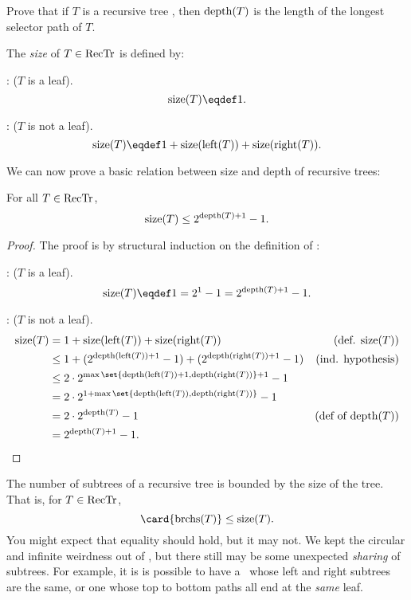 \begin{problem}
Prove that if $T$ is a recursive tree \rectr, then $\text{depth}(T)$ is the
length of the longest selector path of $T$.
\begin{solution}
\end{solution}
\end{problem}

\begin{definition}
The \emph{size} of $T \in \text{RecTr}$ is defined by:

: ($T$ is a leaf).
\[
\sizetr{T} \eqdef 1.
\]

: ($T$ is not a leaf).
\[
\sizetr{T} \eqdef 1 + \sizetr{\leftsub{T}} + \sizetr{\rightsub{T}}.
\]
\end{definition}

We can now prove a basic relation between size and depth of recursive
trees:
\begin{theorem}
For all $T \in \text{RecTr}$,
\[
\text{size}(T) \leq 2^{\text{depth}(T)+1} - 1.
\]
\end{theorem}

\begin{proof}
The proof is by structural induction on the definition of \rectr:

: ($T$ is a leaf).
\[
\sizetr{T} \eqdef 1 = 2^1 - 1 = 2^{\trdpth{T}+1} - 1.
\]

: ($T$ is not a leaf).
\begin{align*}
\sizetr{T}
& = 1 + \sizetr{\leftsub{T}} + \sizetr{\rightsub{T}}
              & \text{(def. $\sizetr{T}$)}\\
& \leq 1 + (2^{\trdpth{\leftsub{T}}+1} -1)  + (2^{\trdpth{\rightsub{T}}+1} -1)
              & \text{(ind. hypothesis)}\\
& \leq  2\cdot 2^{\max\set{\trdpth{\leftsub{T}}+1,\trdpth{\rightsub{T}}}+1} - 1\\
& = 2\cdot 2^{1+\max\set{\trdpth{\leftsub{T}},\trdpth{\rightsub{T}}}} - 1\\
& = 2\cdot 2^{\trdpth{T}} - 1
              & \text{(def of $\trdpth{T}$)}\\
& =  2^{\trdpth{T}+1} - 1.
\end{align*}
\end{proof}

The number of subtrees of a recursive tree is bounded by the size of the
tree.  That is, for $T \in \text{RecTr}$, 
\[
\card{\subbrn{T}} \leq \sizetr{T}.
\]
You might expect that equality should hold, but it may not.  We kept
the circular and infinite weirdness out of \rectr, but there still may
be some unexpected \emph{sharing} of subtrees.  For example, it is is
possible to have a \rectr\ whose left and right subtrees are the same,
or one whose top to bottom paths all end at the \emph{same} leaf.


